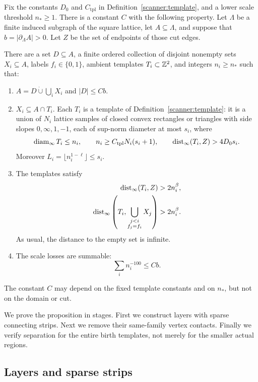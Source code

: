 \begin{proposition}
\label{prop:two-families}
Fix the constants $D_0$ and $C_{\mathrm{tpl}}$ in
Definition~\ref{scanner:template}, and a lower scale threshold $n_*\ge1$.
There is a constant $C$ with the following property.  Let $\Lambda$ be a
finite induced subgraph of the square lattice, let $A\subseteq\Lambda$,
and suppose that $b=|\partial_\Lambda A|>0$.  Let $Z$ be the set of
endpoints of those cut edges.

There are a set $D\subseteq A$, a finite ordered collection of disjoint
nonempty sets $X_i\subseteq A$, labels $f_i\in\{0,1\}$, ambient templates
$T_i\subset\mathbb Z^2$, and integers $n_i\ge n_*$ such that:
\begin{enumerate}
\item
$A=D\mathbin{\dot\cup}\bigcup_iX_i$ and $|D|\le Cb$.
\item
$X_i\subseteq A\cap T_i$.  Each $T_i$ is a template of
Definition~\ref{scanner:template}: it is a union of $N_i$ lattice samples
of closed convex rectangles or triangles with side slopes
$0,\infty,1,-1$, each of sup-norm diameter at most $s_i$, where
\[
 \operatorname{diam}_\infty T_i\le n_i,\qquad
 n_i\ge C_{\mathrm{tpl}}N_i(s_i+1),\qquad
 \operatorname{dist}_\infty(T_i,Z)>4D_0s_i.
\]
Moreover $L_i=\lfloor n_i^{1-\ell}\rfloor\le s_i$.
\item
The templates satisfy
\begin{align}
 \operatorname{dist}_\infty(T_i,Z)&>2n_i^\beta,\label{geometry:cut-clearance}\\
 \operatorname{dist}_\infty\left(T_i,
       \bigcup_{\substack{j<i\\f_j=f_i}}X_j\right)
       &>2n_i^\beta.\label{geometry:ordered-clearance}
\end{align}
As usual, the distance to the empty set is infinite.
\item
The scale losses are summable:
\[
 \sum_i n_i^{-100}\le Cb.
\]
\end{enumerate}
The constant $C$ may depend on the fixed template constants and on $n_*$,
but not on the domain or cut.
\end{proposition}

We prove the proposition in stages.  First we construct layers with
sparse connecting strips.  Next we remove their same-family vertex
contacts.  Finally we verify separation for the entire birth templates,
not merely for the smaller actual regions.

\subsection{Layers and sparse strips}

